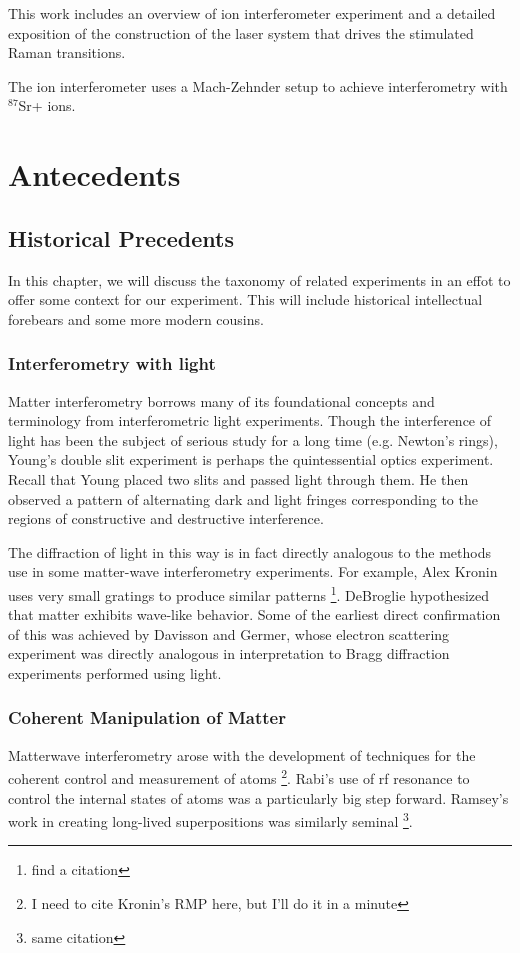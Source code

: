 

This work includes an overview of ion interferometer experiment and a detailed exposition of the construction of the laser system that drives the stimulated Raman transitions.

The ion interferometer uses a Mach-Zehnder setup to achieve interferometry with $^{87}$Sr+ ions.


\chapter{Antecedents}
\section{Historical Precedents}
In this chapter, we will discuss the taxonomy of related experiments in an effot to offer some context for our experiment. This will include historical intellectual forebears and some more modern cousins. 
 \subsection{Interferometry with light}
Matter interferometry borrows many of its foundational concepts and terminology from interferometric light experiments. Though the interference of light has been the subject of serious study for a long time (e.g. Newton's rings), Young's double slit experiment is perhaps the quintessential optics experiment. Recall that Young placed two slits and passed light through them. He then observed a pattern of alternating dark and light fringes corresponding to the regions of constructive and destructive interference. 

The diffraction of light in this way is in fact directly analogous to the methods use in some matter-wave interferometry experiments. For example, Alex Kronin uses very small gratings to produce similar patterns \cite{Kronin_RMP} \footnote{find a citation}. 
DeBroglie hypothesized that matter exhibits wave-like behavior. Some of the earliest direct confirmation of this was achieved by Davisson and Germer, whose electron scattering experiment was directly analogous in interpretation to Bragg diffraction experiments performed using light. 
\subsection{Coherent Manipulation of Matter}
Matterwave interferometry arose with the development of techniques for the coherent control and measurement of atoms \footnote{I need to cite Kronin's RMP here, but I'll do it in a minute}. Rabi's use of rf resonance to control the internal states of atoms was a particularly big step forward. Ramsey's work in creating long-lived superpositions was similarly seminal \footnote{same citation}. 

